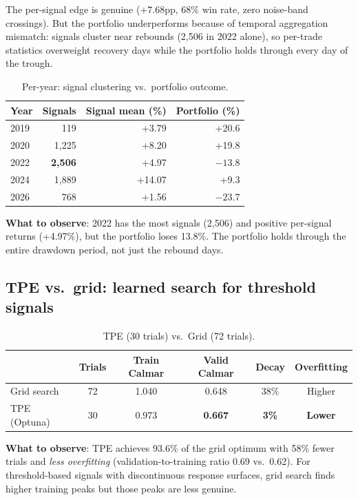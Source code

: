 \documentclass[11pt]{article}
\begin{document}
The per-signal edge is genuine ($+7.68$pp, 68\% win rate, zero noise-band
crossings). But the portfolio underperforms because of temporal aggregation
mismatch: signals cluster near rebounds (2{,}506 in 2022 alone), so
per-trade statistics overweight recovery days while the portfolio holds
through every day of the trough.

\begin{table}[htbp]
\centering
\caption{Per-year: signal clustering vs.\ portfolio outcome.}
\label{tab:years}
\small
\begin{tabular}{@{}lrrr@{}}
\toprule
Year & Signals & Signal mean (\%) & Portfolio (\%) \\
\midrule
2019 & 119 & +3.79 & +20.6 \\
2020 & 1{,}225 & +8.20 & +19.8 \\
2022 & \textbf{2{,}506} & +4.97 & \textbf{$-13.8$} \\
2024 & 1{,}889 & +14.07 & +9.3 \\
2026 & 768 & +1.56 & $-23.7$ \\
\bottomrule
\end{tabular}
\end{table}

\textbf{What to observe}: 2022 has the most signals (2{,}506) and positive
per-signal returns (+4.97\%), but the portfolio loses 13.8\%. The portfolio
holds through the entire drawdown period, not just the rebound days.

\subsection{TPE vs.\ grid: learned search for threshold signals}
\label{sec:bo}

\begin{table}[htbp]
\centering
\caption{TPE (30 trials) vs.\ Grid (72 trials).}
\label{tab:bo}
\small
\begin{tabular}{@{}lccccc@{}}
\toprule
 & Trials & Train Calmar & Valid Calmar & Decay & Overfitting \\
\midrule
Grid search & 72 & 1.040 & 0.648 & 38\% & Higher \\
TPE (Optuna) & 30 & 0.973 & \textbf{0.667} & \textbf{3\%} & \textbf{Lower} \\
\bottomrule
\end{tabular}
\end{table}

\textbf{What to observe}: TPE achieves 93.6\% of the grid optimum with 58\%
fewer trials and \emph{less overfitting} (validation-to-training ratio 0.69
vs.\ 0.62). For threshold-based signals with discontinuous response surfaces,
grid search finds higher training peaks but those peaks are less genuine.
\end{document}
